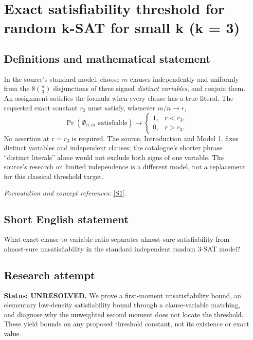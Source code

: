 \documentclass[11pt]{article}
\begin{document}
\section*{\texorpdfstring{Exact satisfiability threshold for random k-SAT for small k (k = 3)}{Exact satisfiability threshold for random k-SAT for small k (k = 3)}}\label{statement}
\subsection{Definitions and mathematical statement}
In the source's standard model, choose $m$ clauses independently and uniformly from the $8\binom n3$ disjunctions of three signed \emph{distinct variables}, and conjoin them. An assignment satisfies the formula when every clause has a true literal. The requested exact constant $r_3$ must satisfy, whenever $m/n\to r$,
\[
 \Pr(\Phi_{n,m}\text{ satisfiable})\to
 \begin{cases}1,&r<r_3,\\0,&r>r_3.\end{cases}
\]
No assertion at $r=r_3$ is required. The source, Introduction and Model 1, fixes distinct variables and independent clauses; the catalogue's shorter phrase ``distinct literals'' alone would not exclude both signs of one variable. The source's research on limited independence is a different model, not a replacement for this classical threshold target.
\par\smallskip\textit{Formulation and concept references:} \href{https://drops.dagstuhl.de/storage/00lipics/lipics-vol351-esa2025/LIPIcs.ESA.2025.103/LIPIcs.ESA.2025.103.pdf}{[S1]}.

\subsection{Short English statement}
What exact clause-to-variable ratio separates almost-sure satisfiability from almost-sure unsatisfiability in the standard independent random 3-SAT model?
\subsection{Research attempt}
\textbf{Status: UNRESOLVED.} We prove a first-moment unsatisfiability bound, an elementary low-density satisfiability bound through a clause-variable matching, and diagnose why the unweighted second moment does not locate the threshold. These yield bounds on any proposed threshold constant, not its existence or exact value.
\end{document}
